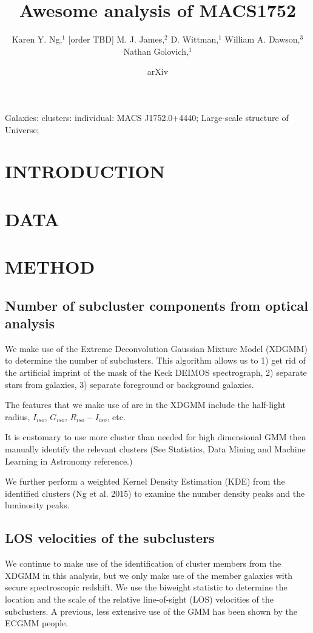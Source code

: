 \documentclass[letterpaper,useAMS,usenatbib]{mn2e}
\title[
	Awesome analysis of MACS1752 
]
{
	Awesome analysis of MACS1752
}
\author[Karen Y. Ng et al.]{Karen Y. Ng,$^{1}$
	[order TBD]
	M. J. James,$^{2}$
	D. Wittman,$^{1}$
	William A. Dawson,$^{3}$ 
	\newauthor Nathan Golovich,$^{1}$
}
\begin{document}
\date{arXiv} \pagerange{\pageref{firstpage}--\pageref{lastpage}}
 \maketitle\label{firstpage}
\begin{abstract} 
	
\end{abstract}
\begin{keywords}
Galaxies: clusters: individual: MACS J1752.0+4440; Large-scale structure of
Universe;
\end{keywords}
\section{INTRODUCTION} 
\section{DATA}
\section{METHOD}


\subsection{Number of subcluster components from optical analysis}
We make use of the Extreme Deconvolution Gaussian Mixture Model (XDGMM) to
determine the number of subclusters. This algorithm allows us to 
1) get rid of the artificial imprint of the mask of the Keck
DEIMOS spectrograph, 2) separate stars from galaxies, 3) separate
foreground or background galaxies.  

The features that we make use of are in the XDGMM include the half-light radius, $I_{iso}$,
$G_{iso}$, $R_{iso} - I_{iso}$, etc. 

It is customary to use more cluster than needed for high
dimensional GMM then manually identify the relevant clusters (See Statistics,
Data Mining and Machine Learning in Astronomy reference.)

We further perform a weighted Kernel Density Estimation (KDE) from the
identified clusters (Ng et al. 2015) to examine the number density
peaks and the luminosity peaks.

\subsection{LOS velocities of the subclusters}
We continue to make use of the identification of cluster members from the XDGMM
in this analysis, but we only make use of the member galaxies with secure
spectroscopic redshift. 
We use the biweight statistic to determine the location and the scale of
the relative line-of-sight (LOS) velocities of the subclusters. A previous,
less extensive use of the GMM has been shown by the ECGMM people.
\end{document}
